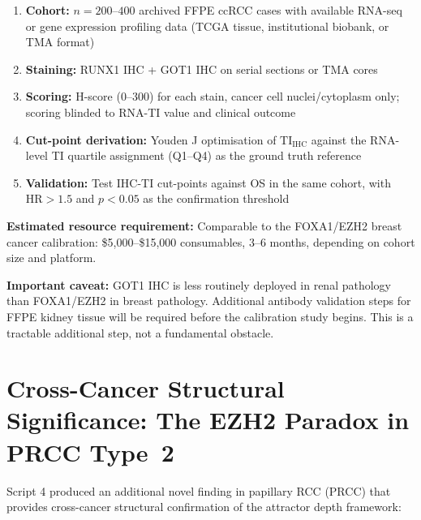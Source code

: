 \documentclass[11pt, a4paper]{article}
\begin{document}
\begin{enumerate}
    \item \textbf{Cohort:} $n = 200$--$400$
    archived FFPE ccRCC cases with available
    RNA-seq or gene expression profiling data
    (TCGA tissue, institutional biobank, or
    TMA format)
    \item \textbf{Staining:} RUNX1 IHC +
    GOT1 IHC on serial sections or TMA cores
    \item \textbf{Scoring:} H-score
    (0--300) for each stain, cancer cell
    nuclei/cytoplasm only; scoring blinded
    to RNA-TI value and clinical outcome
    \item \textbf{Cut-point derivation:}
    Youden J optimisation of
    $\text{TI}_\text{IHC}$ against the
    RNA-level TI quartile assignment
    (Q1--Q4) as the ground truth reference
    \item \textbf{Validation:} Test
    IHC-TI cut-points against OS in
    the same cohort, with
    $\text{HR} > 1.5$ and $p < 0.05$
    as the confirmation threshold
\end{enumerate}

\textbf{Estimated resource requirement:}
Comparable to the FOXA1/EZH2 breast
cancer calibration: \$5,000--\$15,000
consumables, 3--6 months, depending on
cohort size and platform.

\textbf{Important caveat:} GOT1 IHC is
less routinely deployed in renal pathology
than FOXA1/EZH2 in breast pathology.
Additional antibody validation steps for
FFPE kidney tissue will be required before
the calibration study begins. This is a
tractable additional step, not a
fundamental obstacle.

\section{Cross-Cancer Structural Significance:
The EZH2 Paradox in PRCC Type~2}
\label{sec:crosscancer}

Script 4 produced an additional novel finding
in papillary RCC (PRCC) that provides
cross-cancer structural confirmation of the
attractor depth framework:
\end{document}
